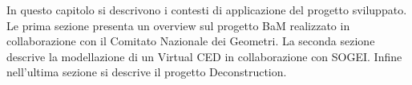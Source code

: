 In questo capitolo si descrivono i contesti di applicazione del progetto sviluppato.
Le prima sezione presenta un overview sul progetto BaM realizzato
in collaborazione con il Comitato Nazionale dei Geometri.
La seconda sezione descrive la modellazione di un Virtual CED in collaborazione con SOGEI.
Infine nell'ultima sezione si descrive il progetto Deconstruction.
